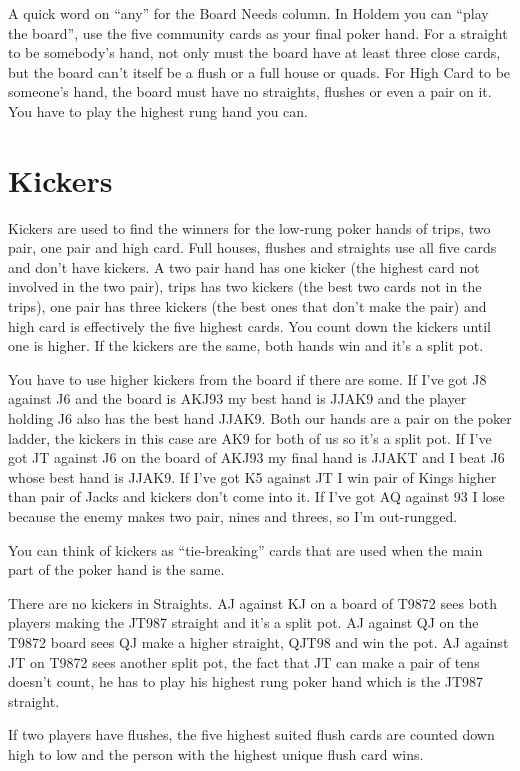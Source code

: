 A quick word on ``any'' for the Board Needs column. In
Holdem you can ``play the board'', use the five community cards as
your final poker hand. For a straight to be somebody's hand, not only
must the board have at least three close cards, but the board can't
itself be a flush or a full house or quads. For High Card to be
someone's hand, the board must have no straights, flushes or even a pair
on it. You have to play the highest rung hand you can.

\section{Kickers}

Kickers are used to find the winners for the low-rung poker hands of
trips, two pair, one pair and high card. Full houses, flushes and
straights use all five cards and don't have kickers. A two pair hand
has one kicker (the highest card not involved in the two pair), trips
has two kickers (the best two cards not in the trips), one pair has
three kickers (the best ones that don't make the pair) and high card
is effectively the five highest cards. You count down the kickers
until one is higher. If the kickers are the same, both hands win and
it's a split pot.

You have to use higher kickers from the board if there are some.
If I've got J8 against J6 and the board is AKJ93 my best hand is JJAK9
and the player holding J6 also has the best hand JJAK9. Both our hands
are a pair on the poker ladder, the kickers in this case are AK9 for
both of us so it's a split pot. If I've got JT against J6 on the board
of AKJ93 my final hand is JJAKT and I beat J6 whose best hand is
JJAK9. If I've got K5 against JT I win pair of Kings higher than pair
of Jacks and kickers don't come into it. If I've got AQ against 93 I
lose because the enemy makes two pair, nines and threes, so I'm
out-rungged.

You can think of kickers as ``tie-breaking'' cards that are used when
the main part of the poker hand is the same.

There are no kickers in Straights. AJ against KJ on a board of
T9872 sees both players making the JT987 straight and it's a split
pot. AJ against QJ on the T9872 board sees QJ make a higher
straight, QJT98 and win the pot. AJ against JT on T9872 sees another
split pot, the fact that JT can make a pair of tens doesn't count, he
has to play his highest rung poker hand which is the JT987 straight.

If two players have flushes, the five highest suited flush cards are
counted down high to low and the person with the highest unique flush
card wins.

